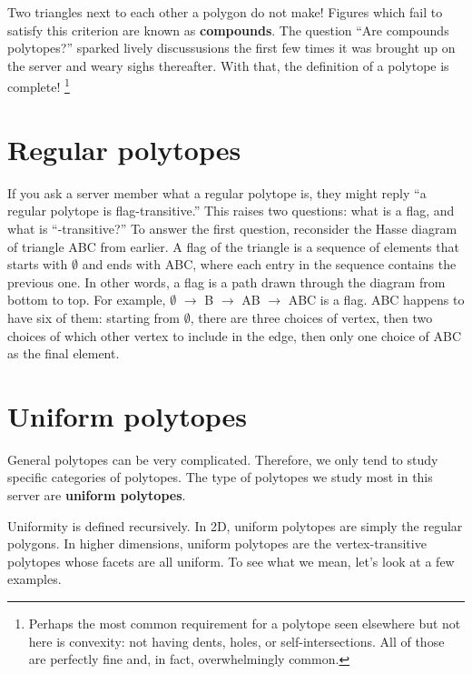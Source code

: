 \documentclass{article}
\begin{document}
Two triangles next to each other a polygon do not make!
Figures which fail to satisfy this criterion are known as \textbf{compounds}.
The question ``Are compounds polytopes?'' sparked lively discussusions
the first few times it was brought up on the server
and weary sighs thereafter.
With that, the definition of a polytope is complete!
\footnote{
  Perhaps the most common requirement for a polytope seen elsewhere but not here
  is convexity: not having dents, holes, or self-intersections.
  All of those are perfectly fine and, in fact, overwhelmingly common.
}

\section{Regular polytopes}

If you ask a server member what a regular polytope is,
they might reply ``a regular polytope is flag-transitive.''
This raises two questions: what is a flag, and what is ``-transitive?''
To answer the first question, reconsider the Hasse diagram of triangle ABC from earlier.
A flag of the triangle is a sequence of elements that starts with $\emptyset$ and ends with ABC,
where each entry in the sequence contains the previous one.
In other words, a flag is a path drawn through the diagram from bottom to top.
For example, $\emptyset$ $\rightarrow$ B $\rightarrow$ AB $\rightarrow$ ABC is a flag.
ABC happens to have six of them:
starting from $\emptyset$, there are three choices of vertex,
then two choices of which other vertex to include in the edge,
then only one choice of ABC as the final element.

\section{Uniform polytopes}
General polytopes can be very complicated. Therefore, we only tend to study specific categories of polytopes. The type of polytopes we study most in this server are \textbf{uniform polytopes}.

Uniformity is defined recursively. In 2D, uniform polytopes are simply the regular polygons.
In higher dimensions, uniform polytopes are the vertex-transitive polytopes whose facets are all uniform. To see what we mean, let's look at a few examples.
\end{document}
